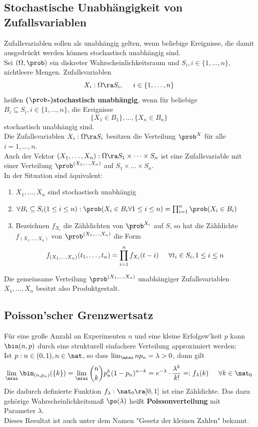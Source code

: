 \documentclass{kit}
\begin{document}
  \subsection{Stochastische Unabhängigkeit von Zufallsvariablen}
    Zufallsvariablen sollen als unabhängig gelten, wenn beliebige Ereignisse, die damit ausgedrückt werden können
    stochastisch unabhängig sind.\\
    Sei $(\Omega,\prob)$ ein diskreter Wahrscheinlichkeitsraum und $S_i,i\in\{1,\dots,n\}$, nichtleere Mengen.
    Zufallsvariablen
    $$X_i:\Omega\ra S_i,\hspace{0.5cm}i\in\{1,\dots,n\}$$
    heißen \textbf{($\prob$-)stochastisch unabhängig}, wenn für beliebige $B_i\subseteq S_i,i\in\{1,\dots,n\}$, die
    Ereignisse 
    $$\{X_1\in B_1\},\dots,\{X_n\in B_n\}$$ 
    stochastisch unabhängig sind.\\
    Die Zufallsvariablen $X_i:\Omega\ra S_i$ besitzen die Verteilung $\prob^X$ für alle $i=1,\dots,n$.\\
    Auch der Vektor $(X_1,\dots,X_n):\Omega\ra S_1\times\dots\times S_n$ ist eine Zufallsvariable mit einer Verteilung
    $\prob^{(X_1,\dots,X_n)}$ auf $S_1\times\dots\times S_n$.\\
    In der Situation sind äquivalent:
    \begin{enumerate}[label=\roman*)]
      \item $X_1,\dots,X_n$ sind stochastisch unabhängig
      \item $\forall B_i\subseteq S_i(1\le i\le n):\prob(X_i\in B_i\forall1\le i\le n)=\prod^n_{i=1}\prob(X_i\in B_i)$
      \item Bezeichnen $f_{X_i}$ die Zähldichten von $\prob^{X_i}$ auf $S$, so hat die Zähldichte $f_{(X_1,\dots,X_n)}$
        von $\prob^{(X_1,\dots,X_n)}$ die Form
        $$f_{(X_1,\dots,X_n)}(t_1,\dots,t_n)=\prod^n_{i=1}f_{X_i}(t-i)\hspace{0.5cm}\forall t_i\in S_i,1\le i\le n$$
    \end{enumerate}
    Die gemeinsame Verteilung $\prob^{(X_1,\dots,X_n)}$ unabhängiger Zufallsvariablen $X_1,\dots,X_n$ besitzt also
    Produktgestalt.
  \subsection{Poisson'scher Grenzwertsatz}
    Für eine große Anzahl an Experimenten $n$ und eine kleine Erfolgsw'keit $p$ kann $\bin(n,p)$ durch eine strukturell
    einfachere Verteilung approximiert werden:\\
    Ist $p:n\in(0,1),n\in\nat$, so dass $\lim_\nrai np_n=\lambda>0$, dann gilt
    $$\lim_\nrai\bin_{(n,p_n)}(\{k\})=\lim_\nrai\binom{n}{k}p^k_n(1-p_n)^{n-k}=e^{-\lambda}\cdot\frac{\lambda^k}{k!}
    =:f_\lambda(k)\hspace{0.5cm}\forall k\in\nat_0$$
    Die dadurch definierte Funktion $f_\lambda:\nat_0\ra[0,1]$ ist eine Zähldichte. Das dazu gehörige 
    Wahrscheinlichkeitsmaß $\po(\lambda)$ heißt \textbf{Poissonverteilung} mit Parameter $\lambda$.\\
    Dieses Resultat ist auch unter dem Namen "Gesetz der kleinen Zahlen" bekannt.
\end{document}
